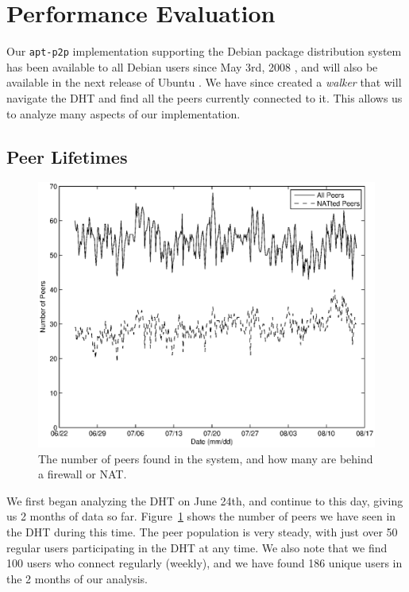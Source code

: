 \documentclass[conference]{IEEEtran}
\begin{document}

\section{Performance Evaluation}
\label{analysis}

Our \texttt{apt-p2p} implementation supporting the Debian package
distribution system has been available to all Debian users since May
3rd, 2008 \cite{apt-p2p-debian}, and will also be available in the
next release of Ubuntu \cite{apt-p2p-ubuntu}. We have since created
a \emph{walker} that will navigate the DHT and find all the peers
currently connected to it. This allows us to analyze many aspects of
our implementation.

\subsection{Peer Lifetimes}
\label{peer_life}

\begin{figure}
\centering
\includegraphics[width=0.80\columnwidth]{AptP2PWalker-peers.eps}
\caption{The number of peers found in the system, and how many are
behind a firewall or NAT.}
\label{walker_peers}
\end{figure}

We first began analyzing the DHT on June 24th, and continue to this
day, giving us 2 months of data so far. Figure~\ref{walker_peers}
shows the number of peers we have seen in the DHT during this time.
The peer population is very steady, with just over 50 regular users
participating in the DHT at any time. We also note that we find 100
users who connect regularly (weekly), and we have found 186 unique
users in the 2 months of our analysis.
\end{document}
